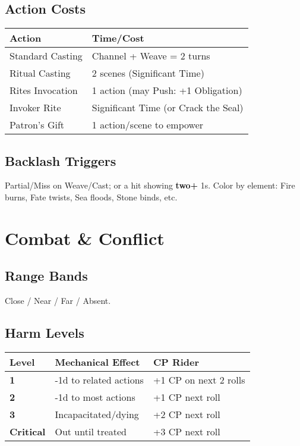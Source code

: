 \begin{multicols}{2}
\subsection*{Action Costs}
\begin{center}
\begin{tabular}{ll}
\toprule
\textbf{Action} & \textbf{Time/Cost} \\
\midrule
Standard Casting & Channel + Weave = 2 turns \\
Ritual Casting & 2 scenes (Significant Time) \\
Rites Invocation & 1 action (may Push: +1 Obligation) \\
Invoker Rite & Significant Time (or Crack the Seal) \\
Patron’s Gift & 1 action/scene to empower \\
\bottomrule
\end{tabular}
\end{center}

\subsection*{Backlash Triggers}
Partial/Miss on Weave/Cast; or a hit showing \textbf{two+} 1s. Color by element: Fire burns, Fate twists, Sea floods, Stone binds, etc.

\section{Combat \& Conflict}

\subsection*{Range Bands}
Close / Near / Far / Absent.

\subsection*{Harm Levels}
\begin{center}
\begin{tabular}{lll}
\toprule
\textbf{Level} & \textbf{Mechanical Effect} & \textbf{CP Rider} \\
\midrule
\textbf{1} & -1d to related actions & +1 CP on next 2 rolls \\
\textbf{2} & -1d to most actions & +1 CP next roll \\
\textbf{3} & Incapacitated/dying & +2 CP next roll \\
\textbf{Critical} & Out until treated & +3 CP next roll \\
\bottomrule
\end{tabular}
\end{center}


\end{multicols}
